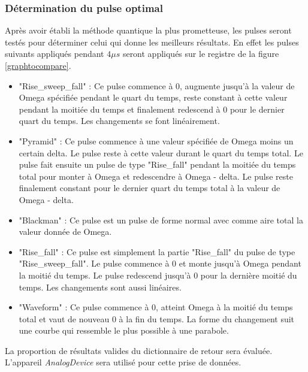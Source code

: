\documentclass[11pt]{article}
\begin{document}
\subsubsection{Détermination du pulse optimal}\label{pulse_opt}
Après avoir établi la méthode quantique la plus prometteuse, les pulses seront testés pour déterminer celui qui donne les meilleurs résultats. En effet les pulses suivants appliqués pendant $4 \mu s$ seront appliqués sur le registre de la figure \ref{graphtocompare}. 
\begin{itemize}
    \item "Rise\_sweep\_fall" : Ce pulse commence à 0, augmente jusqu'à la valeur de Omega spécifiée pendant le quart du temps, reste constant à cette valeur pendant la moitiée du temps et finalement redescend à 0 pour le dernier quart du temps. Les changements se font linéairement.

    \item "Pyramid" : Ce pulse commence à une valeur spécifiée de Omega moins un certain delta. Le pulse reste à cette valeur durant le quart du temps total. Le pulse fait ensuite un pulse de type "Rise\_fall" pendant la moitiée du temps total pour monter à Omega et redescendre à Omega - delta. Le pulse reste finalement constant pour le dernier quart du temps total à la valeur de Omega - delta.
    
    \item "Blackman" : Ce pulse est un pulse de forme normal avec comme aire total la valeur donnée de Omega.

    \item "Rise\_fall" : Ce pulse est simplement la partie "Rise\_fall" du pulse de type "Rise\_sweep\_fall". Le pulse commence à 0 et monte jusqu'à Omega pendant la moitié du temps. Le pulse redescend jusqu'à 0 pour la dernière moitié du temps. Les changements sont aussi linéaires. 

    \item "Waveform" : Ce pulse commence à 0, atteint Omega à la moitié du temps total et vaut de nouveau 0 à la fin du temps. La forme du changement suit une courbe qui ressemble le plus possible à une parabole.
\end{itemize}



La proportion de résultats valides du dictionnaire de retour sera évaluée. L'appareil \textit{AnalogDevice} sera utilisé pour cette prise de données.
\end{document}
